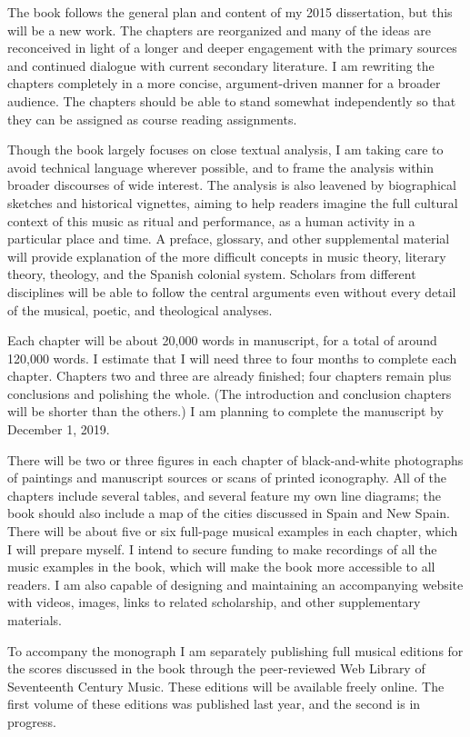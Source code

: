 \documentclass{vcbook-proposal}
\begin{document}
The book follows the general plan and content of my 2015 dissertation, but this 
will be a new work.%
    \Autocite{Cashner:PhD}
The chapters are reorganized and many of the ideas are reconceived in light of a
longer and deeper engagement with the primary sources and continued dialogue
with current secondary literature.
I am rewriting the chapters completely in a more concise, argument-driven manner
for a broader audience.
The chapters should be able to stand somewhat independently so that they can be
assigned as course reading assignments.

Though the book largely focuses on close textual analysis, I am taking care to
avoid technical language wherever possible, and to frame the analysis within
broader discourses of wide interest.
The analysis is also leavened by biographical sketches and historical vignettes,
aiming to help readers imagine the full cultural context of this
music as ritual and performance, as a human activity in a particular place and
time.
A preface, glossary, and other supplemental material will provide explanation of
the more difficult concepts in music theory, literary theory, theology, and the
Spanish colonial system.
Scholars from different disciplines will be able to follow the central arguments
even without every detail of the musical, poetic, and theological analyses.

Each chapter will be about 20,000 words in manuscript, for a total of around
120,000 words.
I estimate that I will need three to four months to complete each chapter.
Chapters two and three are already finished; four chapters remain plus
conclusions and polishing the whole.
(The introduction and conclusion chapters will be shorter than the others.)
I am planning to complete the manuscript by December 1, 2019.

There will be two or three figures in each chapter of black-and-white
photographs of paintings and manuscript sources or scans of printed iconography.
All of the chapters include several tables, and several feature my own line
diagrams; the book should also include a map of the cities discussed in Spain
and New Spain.  
There will be about five or six full-page musical examples in each chapter,
which I will prepare myself.
I intend to secure funding to make recordings of all the music examples in the
book, which will make the book more accessible to all readers.
I am also capable of designing and maintaining an accompanying website with
videos, images, links to related scholarship, and other supplementary materials.

To accompany the monograph I am separately publishing full musical editions for
the scores discussed in the book through the peer-reviewed Web Library of
Seventeenth Century Music.%
    \Autocite{Cashner:WLSCM32}
These editions will be available freely online.
The first volume of these editions was published last year, and the second is in
progress.

\end{document}
